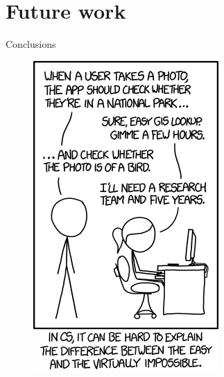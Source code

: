 \documentclass{beamer}
\begin{document}
\section{Future work}

\begin{frame}{Conclusions}

\begin{figure}[h]
  
  \begin{minipage}[b]{0.3\textwidth}
    \includegraphics[width=\textwidth]{img/joke}
  \end{minipage}
  \hfill
  \begin{minipage}[t]{0.55\textwidth}
	

\end{minipage}
\end{figure}
\end{frame}
\end{document}
